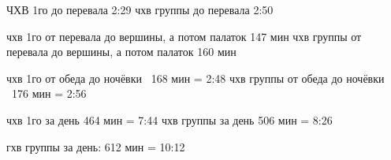 





ЧХВ 1го до перевала 2:29
чхв группы до перевала 2:50

чхв 1го от перевала до вершины, а потом палаток 147 мин
чхв группы от перевала до вершины, а потом палаток 160 мин

чхв 1го от обеда до ночёвки ~168 мин = 2:48
чхв группы от обеда до ночёвки ~176 мин = 2:56

чхв 1го за день 464 мин = 7:44
чхв группы за день 506 мин = 8:26

гхв группы за день: 612 мин = 10:12



    \FloatBarrier
